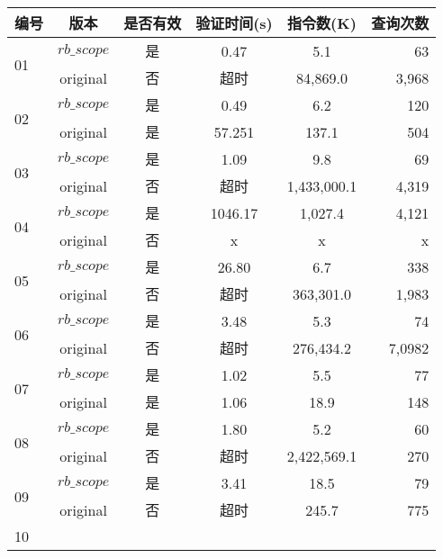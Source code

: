 \begin{table}
  \centering
  \small
  \begin{tabular}{|p{0.80cm}|c|c|c|c|r|}
    \hline
    编号 & 版本 & 是否有效 & 验证时间(s)& 指令数(K) & 查询次数 \\
    \hline
    \multirow{2}{0.80cm}{01}
    & $rb\_scope$ &是 &  0.47  & 5.1 & 63  \\  \cline{2-6}
    & original &  否 & 超时 &   84,869.0 & 3,968  \\
    \hline
    \multirow{2}{0.80cm}{02}
    & $rb\_scope$ &是 & 0.49 & 6.2 & 120  \\  \cline{2-6}
    & original & 是 & 57.251 &  137.1 & 504  \\
    \hline
    \multirow{2}{0.80cm}{03}
    & $rb\_scope$ &是 & 1.09 & 9.8 & 69  \\  \cline{2-6}
    & original &  否 & 超时 &  1,433,000.1 & 4,319  \\
    \hline
    \multirow{2}{0.80cm}{04}
    & $rb\_scope$ &是 &  1046.17 & 1,027.4 & 4,121  \\  \cline{2-6}
    & original & 否 & x &  x & x  \\
    \hline
    \multirow{2}{0.80cm}{05}
    & $rb\_scope$ &是 &  26.80 & 6.7 & 338  \\  \cline{2-6}
    & original & 否 & 超时 &  363,301.0 & 1,983   \\
    \hline
    \multirow{2}{0.80cm}{06}
    & $rb\_scope$ &是 &  3.48 & 5.3 & 74  \\  \cline{2-6}
    & original & 否 &超时  & 276,434.2 & 7,0982  \\
    \hline
    \multirow{2}{0.80cm}{07}
    & $rb\_scope$ &是 &  1.02 & 5.5 & 77  \\  \cline{2-6}
    & original & 是 & 1.06 & 18.9   & 148  \\
    \hline
    \multirow{2}{0.80cm}{08}
    & $rb\_scope$ &是 &  1.80 & 5.2 & 60  \\  \cline{2-6}
    & original & 否 & 超时 &  2,422,569.1 & 270  \\
    \hline
    \multirow{2}{0.80cm}{09}
    & $rb\_scope$ &是 &  3.41 & 18.5 & 79  \\  \cline{2-6}
    & original & 否 & 超时 &  245.7 & 775  \\
    \hline
    \multirow{2}{0.80cm}{10}

\end{tabular}
\end{table}
